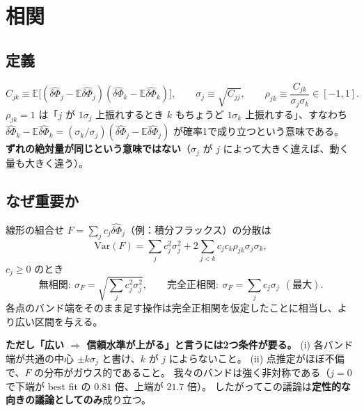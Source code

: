 \documentclass[11pt,a4paper]{ltjsarticle}
\newcommand{\dPh}{\widehat{\delta\Phi}}
\newcommand{\E}{\mathbb{E}}
\newcommand{\Var}{\mathrm{Var}}
\begin{document}
\section{相関}

\subsection{定義}
\begin{equation}
C_{jk}\equiv\E\big[(\dPh_j-\E\dPh_j)(\dPh_k-\E\dPh_k)\big],\qquad
\sigma_j\equiv\sqrt{C_{jj}},\qquad
\rho_{jk}\equiv\frac{C_{jk}}{\sigma_j\sigma_k}\in[-1,1].
\end{equation}
$\rho_{jk}=1$ は「$j$ が $1\sigma_j$ 上振れするとき $k$ もちょうど $1\sigma_k$ 上振れする」、すなわち
$\dPh_k-\E\dPh_k=(\sigma_k/\sigma_j)(\dPh_j-\E\dPh_j)$ が確率1で成り立つという意味である。
\textbf{ずれの絶対量が同じという意味ではない}（$\sigma_j$ が $j$ によって大きく違えば、動く量も大きく違う）。

\subsection{なぜ重要か}
線形の組合せ $F=\sum_j c_j\dPh_j$（例：積分フラックス）の分散は
\begin{equation}
\Var(F)=\sum_j c_j^2\sigma_j^2+2\sum_{j<k}c_jc_k\rho_{jk}\sigma_j\sigma_k,
\end{equation}
$c_j\ge0$ のとき
\begin{equation}
\text{無相関}:\ \sigma_F=\sqrt{\textstyle\sum_j c_j^2\sigma_j^2},
\qquad
\text{完全正相関}:\ \sigma_F=\sum_j c_j\sigma_j\ \ (\text{最大}).
\end{equation}
各点のバンド端をそのまま足す操作は完全正相関を仮定したことに相当し、より広い区間を与える。

\textbf{ただし「広い $\Rightarrow$ 信頼水準が上がる」と言うには2つ条件が要る。}
(i) 各バンド端が共通の中心 $\pm k\sigma_j$ と書け、$k$ が $j$ によらないこと。
(ii) 点推定がほぼ不偏で、$F$ の分布がガウス的であること。
我々のバンドは強く非対称である（$j=0$ で下端が best fit の $0.81$ 倍、上端が $21.7$ 倍）。
したがってこの議論は\textbf{定性的な向きの議論としてのみ}成り立つ。
\end{document}

